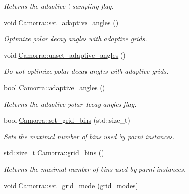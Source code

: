 \begin{DoxyCompactItemize}
\begin{DoxyCompactList}\small\item\em Returns the adaptive t-\/sampling flag. \end{DoxyCompactList}\item 
\hypertarget{a00831_acc556f61f831cf0c8d89742ce981ff8c}{
void \hyperlink{a00831_acc556f61f831cf0c8d89742ce981ff8c}{Camorra::set\_\-adaptive\_\-angles} ()}
\label{a00831_acc556f61f831cf0c8d89742ce981ff8c}

\begin{DoxyCompactList}\small\item\em Optimize polar decay angles with adaptive grids. \end{DoxyCompactList}\item 
\hypertarget{a00831_afcc112f29448eea96b957d0cbe2507f2}{
void \hyperlink{a00831_afcc112f29448eea96b957d0cbe2507f2}{Camorra::unset\_\-adaptive\_\-angles} ()}
\label{a00831_afcc112f29448eea96b957d0cbe2507f2}

\begin{DoxyCompactList}\small\item\em Do not optimize polar decay angles with adaptive grids. \end{DoxyCompactList}\item 
\hypertarget{a00831_af43bdefe26b0a357ead80b081285b99f}{
bool \hyperlink{a00831_af43bdefe26b0a357ead80b081285b99f}{Camorra::adaptive\_\-angles} ()}
\label{a00831_af43bdefe26b0a357ead80b081285b99f}

\begin{DoxyCompactList}\small\item\em Returns the adaptive polar decay angles flag. \end{DoxyCompactList}\item 
bool \hyperlink{a00831_a6d2bc8b8821a29006938082d6b6bef2d}{Camorra::set\_\-grid\_\-bins} (std::size\_\-t)
\begin{DoxyCompactList}\small\item\em Sets the maximal number of bins used by parni instances. \end{DoxyCompactList}\item 
\hypertarget{a00831_a5febf7380bc1a76257efddb93a86f603}{
std::size\_\-t \hyperlink{a00831_a5febf7380bc1a76257efddb93a86f603}{Camorra::grid\_\-bins} ()}
\label{a00831_a5febf7380bc1a76257efddb93a86f603}

\begin{DoxyCompactList}\small\item\em Returns the maximal number of bins used by parni instances. \end{DoxyCompactList}\item 
\hypertarget{a00831_a7e1437ec1a247b7c32bd4923efabf6b6}{
void \hyperlink{a00831_a7e1437ec1a247b7c32bd4923efabf6b6}{Camorra::set\_\-grid\_\-mode} (grid\_\-modes)}
\label{a00831_a7e1437ec1a247b7c32bd4923efabf6b6}


\end{DoxyCompactItemize}
